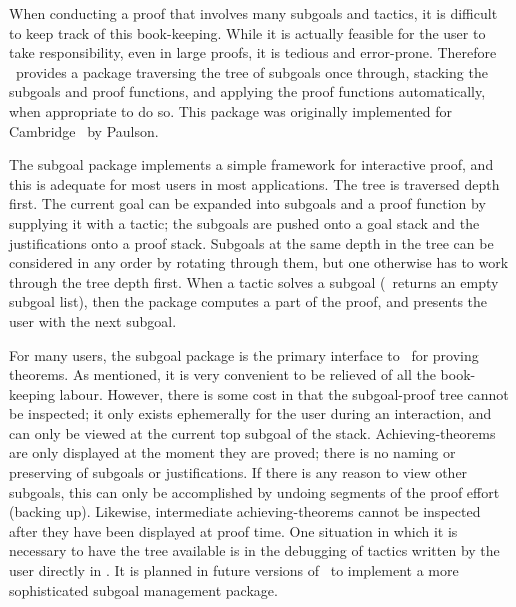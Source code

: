 When conducting a proof that involves many subgoals and tactics, 
it is difficult
to keep track of this book-keeping.
While it is actually feasible for the user to take responsibility,
even in large proofs, it is tedious and error-prone.
Therefore \HOL\ provides a package
traversing the tree of subgoals once through, stacking the subgoals
and proof functions, and applying the proof functions 
automatically, when appropriate
to do so.
This package was originally implemented for Cambridge \LCF\ by
 Paulson.

The subgoal package implements a simple framework for interactive proof,
and this is adequate for most users in most applications. 
The tree is traversed depth first.  The current goal can be expanded
into subgoals and a proof function by supplying it with a tactic; 
the subgoals are pushed onto a goal
stack
 and the justifications onto a proof stack.
Subgoals  at the same depth in the tree
can be considered in any order by rotating
 through them, but one
otherwise has to work through the tree depth first.
When a tactic solves a
subgoal (\ie\ returns an empty subgoal list), then the package computes
a part of the proof, and presents the user with the next subgoal.

For many users, the subgoal package
 is the
primary interface to \HOL\ for proving theorems.  As mentioned, it is
very convenient to be relieved of all the book-keeping labour.
However, there is some cost in that the subgoal-proof tree
 cannot be inspected;
it only exists ephemerally for the user during an interaction,
and can only be viewed at the current top subgoal of the stack.
Achieving-theorems are only displayed at the moment they are proved;
there is no naming or preserving of subgoals or justifications.
If there is any reason to view
other subgoals, this can only be accomplished by undoing segments of
the proof effort (backing up). Likewise, intermediate achieving-theorems
cannot be inspected after they have been displayed at proof time.  One
situation in which it is necessary
to have the tree available is in the debugging
 of tactics written
by the user directly in \ML. It is planned in future versions of
\HOL\ to implement a more sophisticated subgoal management package.

